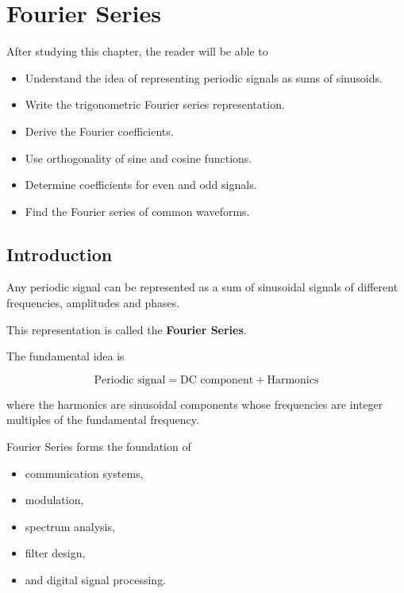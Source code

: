 
\chapter{Fourier Series}

\begin{tcolorbox}[colback=blue!5!white,colframe=blue!70!black,title=Learning Objectives]

After studying this chapter, the reader will be able to

\begin{itemize}
\item Understand the idea of representing periodic signals as sums of sinusoids.
\item Write the trigonometric Fourier series representation.
\item Derive the Fourier coefficients.
\item Use orthogonality of sine and cosine functions.
\item Determine coefficients for even and odd signals.
\item Find the Fourier series of common waveforms.
\end{itemize}

\end{tcolorbox}


\section{Introduction}

Any periodic signal can be represented as a sum of sinusoidal signals of
different frequencies, amplitudes and phases.

This representation is called the \textbf{Fourier Series}.

The fundamental idea is

\[
\boxed{
\text{Periodic signal}
=
\text{DC component}
+
\text{Harmonics}
}
\]

where the harmonics are sinusoidal components whose frequencies are integer
multiples of the fundamental frequency.

Fourier Series forms the foundation of

\begin{itemize}
\item communication systems,
\item modulation,
\item spectrum analysis,
\item filter design,
\item and digital signal processing.
\end{itemize}

